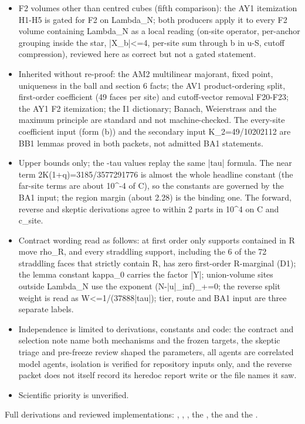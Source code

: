 \begin{gatequote}
\begin{itemize}
factor is missing, so the cited statement and its use are covered. The excerpt
is not a premise of the frozen packet, the original Kotecky-Preiss paper is
neither committed nor needed, and every bound value is at least the value
proved by the self-contained iterated\_split route.
\item F2 volumes other than centred cubes (fifth comparison): the AY1
itemization H1-H5 is gated for F2 on Lambda\_N; both producers apply it to
every F2 volume containing Lambda\_N as a local reading (on-site operator,
per-anchor grouping inside the star, |X\_b|<=4, per-site sum through b in u-S,
cutoff compression), reviewed here as correct but not a gated statement.
\item Inherited without re-proof: the AM2 multilinear majorant, fixed point,
uniqueness in the ball and section 6 facts; the AV1 product-ordering split,
first-order coefficient (49 faces per site) and cutoff-vector removal F20-F23;
the AY1 F2 itemization; the I1 dictionary; Banach, Weierstrass and the maximum
principle are standard and not machine-checked. The every-site coefficient
input (form (b)) and the secondary input K\_2=49/10202112 are BB1 lemmas
proved in both packets, not admitted BA1 statements.
\item Upper bounds only; the -tau values replay the same |tau| formula. The
near term 2K(1+q)=3185/3577291776 is almost the whole headline constant (the
far-site terms are about 10\textasciicircum{}-4 of C), so the constants are
governed by the BA1 input; the region margin (about 2.28) is the binding one.
The forward, reverse and skeptic derivations agree to within 2 parts in
10\textasciicircum{}4 on C and c\_site.
\item Contract wording read as follows: at first order only supports contained
in R move rho\_R, and every straddling support, including the 6 of the 72
straddling faces that strictly contain R, has zero first-order R-marginal
(D1); the lemma constant kappa\_0 carries the factor |Y|; union-volume sites
outside Lambda\_N use the exponent (N-|u|\_inf)\_+=0; the reverse split weight
is read as W<=1/(37888|tau|); tier, route and BA1 input are three separate
labels.
\item Independence is limited to derivations, constants and code: the contract
and selection note name both mechanisms and the frozen targets, the skeptic
triage and pre-freeze review shaped the parameters, all agents are correlated
model agents, isolation is verified for repository inputs only, and the
reverse packet does not itself record its heredoc report write or the file
names it saw.
\item Scientific priority is unverified.
\end{itemize}
\end{gatequote}
Full derivations and reviewed implementations:
,
,
, the
, the
 and the .
